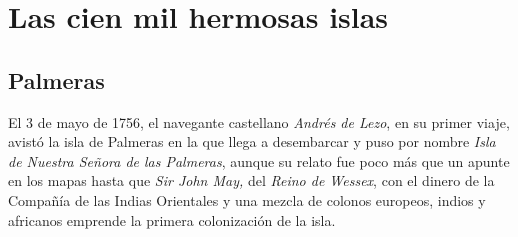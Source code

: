 \chapter{Las cien mil hermosas islas}

\section{Palmeras}

El 3 de mayo de 1756, el navegante castellano \emph{Andrés de Lezo}, en su primer viaje, avistó la isla de Palmeras en la que llega a desembarcar y puso por nombre \emph{Isla de Nuestra Señora de las Palmeras}, aunque su relato fue poco más que un apunte en los mapas hasta que \emph{Sir John May,} del \emph{Reino de Wessex}, con el dinero de la Compañía de las Indias Orientales y una mezcla de colonos europeos, indios y africanos emprende la primera colonización de la isla.